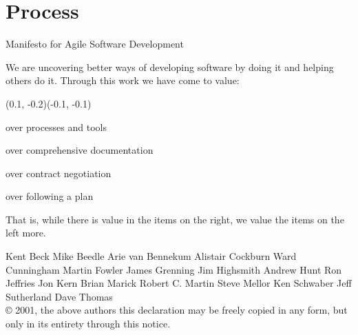 \documentclass[14pt]{beamer}
\begin{document}
  \section{Process}
    \blankscreen{}
    \begin{frame}{\large Manifesto for Agile Software Development}

      {\footnotesize \color{black} We are uncovering better ways of developing
      software by doing it and helping others do it.
      Through this work we have come to value:}

      \vfill

      (0.1, -0.2)(-0.1, -0.1)
      \begin{description}
        \begin{small}
          \item [Individuals and interactions] over processes and tools
          \item [Working software] over comprehensive documentation
          \item [Customer collaboration] over contract negotiation
          \item [Responding to change] over following a plan
        \end{small}
      \end{description}

      \vfill

      {\footnotesize That is, while there is value in the items on
      the right, we value the items on the left more.}

      \begin{block}{}
        {\tiny
          Kent Beck\hspace{5pt}
          Mike Beedle\hspace{5pt}
          Arie van Bennekum\hspace{5pt}
          Alistair Cockburn\hspace{5pt}
          Ward Cunningham\hspace{5pt}
          Martin Fowler\hspace{5pt}
          James Grenning\hspace{5pt}
          Jim Highsmith\hspace{5pt}
          Andrew Hunt\hspace{5pt}
          Ron Jeffries\hspace{5pt}
          Jon Kern\hspace{5pt}
          Brian Marick\hspace{5pt}
          Robert C. Martin\hspace{5pt}
          Steve Mellor\hspace{5pt}
          Ken Schwaber\hspace{5pt}
          Jeff Sutherland\hspace{5pt}
          Dave Thomas\\
          © 2001, the above authors
          this declaration may be freely copied in any form, but only in its entirety through this notice.}
      \end{block}

    \end{frame}
\end{document}
